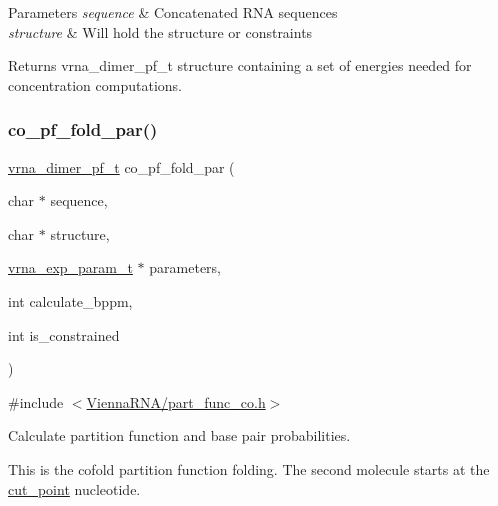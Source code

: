\begin{DoxyParams}{Parameters}
{\em sequence} & Concatenated R\+NA sequences \\
\hline
{\em structure} & Will hold the structure or constraints \\
\hline
\end{DoxyParams}
\begin{DoxyReturn}{Returns}
vrna\+\_\+dimer\+\_\+pf\+\_\+t structure containing a set of energies needed for concentration computations. 
\end{DoxyReturn}
\mbox{\label{group__part__func__global__deprecated_gaabfc6cb6d02b8f08ac4c92f4f5b125d9}} 
\subsubsection{\texorpdfstring{co\_pf\_fold\_par()}{co\_pf\_fold\_par()}}
{\footnotesize\ttfamily \mbox{\hyperlink{group__pf__cofold_ga444df1587c9a2ca15b8eb25188f629c3}{vrna\+\_\+dimer\+\_\+pf\+\_\+t}} co\+\_\+pf\+\_\+fold\+\_\+par (\begin{DoxyParamCaption}\item[{char $\ast$}]{sequence,  }\item[{char $\ast$}]{structure,  }\item[{\mbox{\hyperlink{group__energy__parameters_ga01d8b92fe734df8d79a6169482c7d8d8}{vrna\+\_\+exp\+\_\+param\+\_\+t}} $\ast$}]{parameters,  }\item[{int}]{calculate\+\_\+bppm,  }\item[{int}]{is\+\_\+constrained }\end{DoxyParamCaption})}



{\ttfamily \#include $<$\mbox{\hyperlink{part__func__co_8h}{Vienna\+R\+N\+A/part\+\_\+func\+\_\+co.\+h}}$>$}



Calculate partition function and base pair probabilities. 

This is the cofold partition function folding. The second molecule starts at the \mbox{\hyperlink{fold__vars_8h_ab9b2c3a37a5516614c06d0ab54b97cda}{cut\+\_\+point}} nucleotide.

